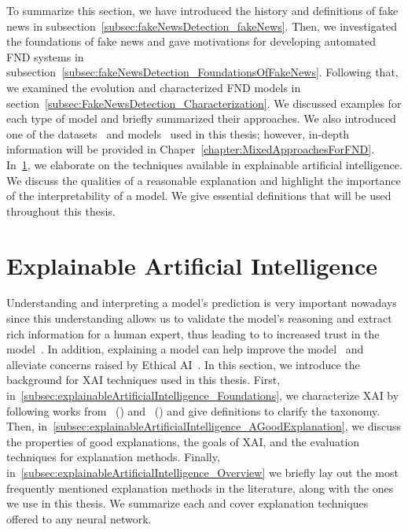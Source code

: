 To summarize this section, we have introduced the history and definitions of fake news in subsection~\ref{subsec:fakeNewsDetection_fakeNews}. Then, we investigated the foundations of fake news and gave motivations for developing automated FND systems in subsection~\ref{subsec:fakeNewsDetection_FoundationsOfFakeNews}. Following that, we examined the evolution and characterized FND models in section~\ref{subsec:FakeNewsDetection_Characterization}. We discussed examples for each type of model and briefly summarized their approaches. We also introduced one of the datasets~\parencite{UPFD_Dataset_Shu} and models~\parencite{GraphSAGE_Hamilton} used in this thesis; however, in-depth information will be provided in Chaper~\ref{chapter:MixedApproachesForFND}.\\
In~\ref{sec:explainableArtificialIntelligence}, we elaborate on the techniques available in explainable artificial intelligence. We discuss the qualities of a reasonable explanation and highlight the importance of the interpretability of a model. We give essential definitions that will be used throughout this thesis.

\section{Explainable Artificial Intelligence}
\label{sec:explainableArtificialIntelligence}
Understanding and interpreting a model's prediction is very important nowadays since this understanding allows us to validate the model's reasoning and extract rich information for a human expert, thus leading to to increased trust in the model~\parencite{WhyShouldITrustYou_Riberio}. In addition, explaining a model can help improve the model~\parencite{AUnifiedApproach_Lundberg} and alleviate concerns raised by Ethical AI~\parencite{MachineBias_Angwin, EURegulationsOnDecisionMaking_Goodman}.
In this section, we introduce the background for XAI techniques used in this thesis. First, in~\ref{subsec:explainableArtificialIntelligence_Foundations}, we characterize XAI by following works from~\citeauthor{TheMythosOfModelInterpretability_Lipton} (\citeyear{TheMythosOfModelInterpretability_Lipton}) and~\citeauthor{XAIConceptsTaxonomies_Arrieta} (\citeyear{XAIConceptsTaxonomies_Arrieta}) and give definitions to clarify the taxonomy. Then, in~\ref{subsec:explainableArtificialIntelligence_AGoodExplanation}, we discuss the properties of good explanations, the goals of XAI, and the evaluation techniques for explanation methods. Finally, in~\ref{subsec:explainableArtificialIntelligence_Overview} we briefly lay out the most frequently mentioned explanation methods in the literature, along with the ones we use in this thesis. We summarize each and cover explanation techniques offered to any  neural network.

